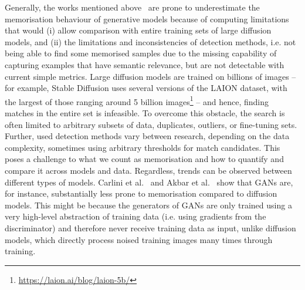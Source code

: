 \documentclass[conference,table]{IEEEtran} %
\begin{document}
Generally, the works mentioned above~\cite{somepalli_diffusion_2022, somepalli_understanding_2023, carlini_extracting_2023, carlini_extracting_2021} are prone to underestimate the memorisation behaviour of generative models because of computing limitations that would (i) allow comparison with entire training sets of large diffusion models, and (ii) the limitations and inconsistencies of detection methods, i.e. not being able to find some memorised samples due to the missing capability of capturing examples that have semantic relevance, but are not detectable with current simple metrics. %
Large diffusion models are trained on billions of images -- for example, Stable Diffusion uses several versions of the LAION dataset, with the largest of those ranging around 5 billion images\footnote{\url{https://laion.ai/blog/laion-5b/}} -- and hence, finding matches in the entire set is infeasible. To overcome this obstacle, the search is often limited to arbitrary subsets of data, duplicates, outliers, or fine-tuning sets. Further, used detection methods vary between research, depending on the data complexity, sometimes using arbitrary thresholds for match candidates. This poses a challenge to what we count as memorisation and how to quantify and compare it across models and data.
Regardless, trends can be observed between different types of models. Carlini et al.~\cite{carlini_extracting_2023} and Akbar et al.~\cite{akbar_beware_2023} show that GANs are, for instance, substantially less prone to memorisation compared to diffusion models.
This might be because the generators of GANs are only trained using a very high-level abstraction of training data (i.e. using gradients from the discriminator) and therefore never receive training data as input, unlike diffusion models, which directly process noised training images many times through training.
\end{document}
